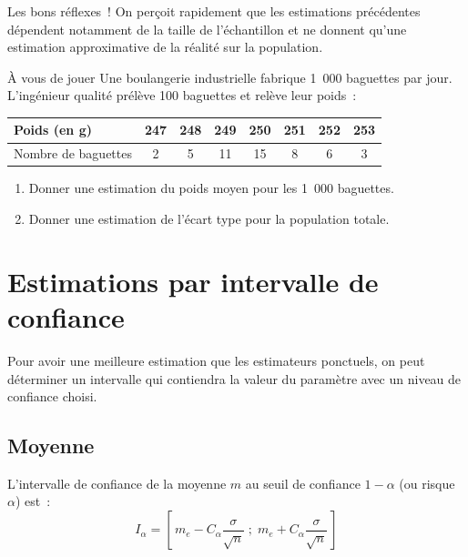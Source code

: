 \documentclass[11pt,a4paper]{article}
\begin{document}
\begin{cadre}[colback=orange!10!white]{Les bons réflexes~!}
On perçoit rapidement que les estimations précédentes dépendent notamment de la taille de l'échantillon et ne donnent qu'une estimation approximative de la réalité sur la population.
\end{cadre}

\begin{cadre}[colback=green!8!white]{À vous de jouer}
Une boulangerie industrielle fabrique 1~000 baguettes par jour. L'ingénieur qualité prélève 100 baguettes et relève leur poids~:

\begin{center}
\begin{tabular}{|l|c|c|c|c|c|c|c|}
\hline
Poids (en g) & 247 & 248 & 249 & 250 & 251 & 252 & 253 \\
\hline
Nombre de baguettes & 2 & 5 & 11 & 15 & 8 & 6 & 3 \\
\hline
\end{tabular}
\end{center}

\begin{enumerate}[leftmargin=6mm]
\item Donner une estimation du poids moyen pour les 1~000 baguettes.
\item Donner une estimation de l'écart type pour la population totale.
\end{enumerate}
\end{cadre}

\newpage
\section{Estimations par intervalle de confiance}

Pour avoir une meilleure estimation que les estimateurs ponctuels, on peut déterminer un intervalle qui contiendra la valeur du paramètre avec un niveau de confiance choisi.

\subsection{Moyenne}

\begin{definition}
L'intervalle de confiance de la moyenne $m$ au seuil de confiance $1-\alpha$ (ou risque $\alpha$) est~:
$$I_\alpha = \left[\, m_e - C_\alpha \dfrac{\sigma}{\sqrt{n}} \;;\; m_e + C_\alpha \dfrac{\sigma}{\sqrt{n}} \,\right]$$
\end{definition}
\end{document}
